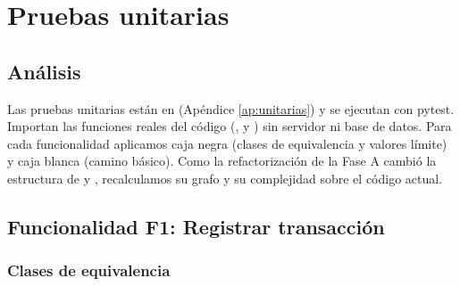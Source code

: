 \section{Pruebas unitarias}

\subsection{Análisis}

Las pruebas unitarias están en  (Apéndice \ref{ap:unitarias}) y se ejecutan con pytest. Importan las funciones reales del código (,  y ) sin servidor ni base de datos. Para cada funcionalidad aplicamos caja negra (clases de equivalencia y valores límite) y caja blanca (camino básico). Como la refactorización de la Fase A cambió la estructura de  y , recalculamos su grafo y su complejidad sobre el código actual.


\subsection{Funcionalidad F1: Registrar transacción}

\subsubsection{Clases de equivalencia}

